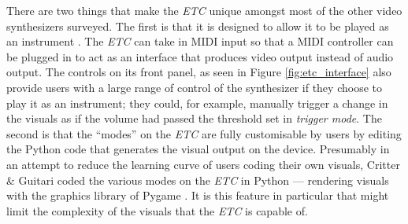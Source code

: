 \documentclass[../../main_report1.tex]{subfiles}
\begin{document}
There are two things that make the \textit{ETC} unique amongst most of the other video synthesizers surveyed. The first is that it is designed to allow it to be played as an instrument \cite{ETCmanual}. The \textit{ETC} can take in MIDI input so that a MIDI controller can be plugged in to act as an interface that produces video output instead of audio output. The controls on its front panel, as seen in Figure \ref{fig:etc_interface} also provide users with a large range of control of the synthesizer if they choose to play it as an instrument; they could, for example, manually trigger a change in the visuals as if the volume had passed the threshold set in \textit{trigger mode}. The second is that the ``modes'' on the \textit{ETC} are fully customisable by users by editing the Python code that generates the visual output on the device. Presumably in an attempt to reduce the learning curve of users coding their own visuals, Critter \& Guitari coded the various modes on the \textit{ETC} in Python --- rendering visuals with the graphics library of Pygame \cite{ETCmanual}. It is this feature in particular that might limit the complexity of the visuals that the \textit{ETC} is capable of.
\end{document}
